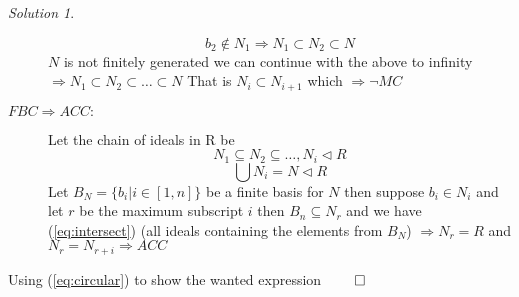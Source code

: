 \documentclass[a4paper,twoside=false,abstract=false,numbers=noenddot,
titlepage=false,headings=small,parskip=half,version=last]{scrartcl}
\theoremstyle{definition}
\theoremstyle{remark}
\newtheorem*{solution}{Solution}
\begin{document}
\begin{solution}
\begin{description}
\begin{equation}
            b_2 \notin N_1 \Rightarrow N_1 \subset N_2 \subset N
        \end{equation}
        $N$ is not finitely generated we can continue with the above to
        infinity $\Rightarrow N_1 \subset N_2 \subset \ldots \subset N$
        That is $N_i \subset N_{i+1}$ which $\Rightarrow \lnot{MC}$
    \item[$FBC\Rightarrow ACC:$]
        Let the chain of ideals in R be
        \begin{equation}
            N_1 \subseteq N_2 \subseteq \dots, N_i \lhd R
        \end{equation}
        \begin{equation}
            \label{eq:intersect}
            \bigcup{N_i}=N\lhd R
        \end{equation}
        Let $B_N=\{b_i|i\in \left[1,n\right]\}$ be a finite basis for $N$ then
        suppose $b_i \in N_i$ and let $r$ be the maximum subscript $i$ then
        $B_n \subseteq N_r$ and we have (\ref{eq:intersect}) (all ideals
        containing the elements from $B_N$) $\Rightarrow N_r=R$ and 
        $N_r=N_{r+i} \Rightarrow ACC$

\end{description}
Using (\ref{eq:circular}) to show the wanted expression $\qed$


\end{solution}
\end{document}
